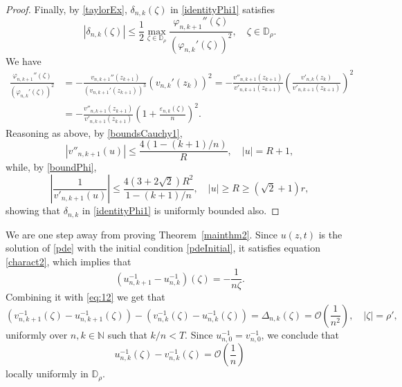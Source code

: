\documentclass[reqno,11pt]{amsart}
\theoremstyle{plain}
\theoremstyle{definition}
\theoremstyle{remark}
\numberwithin{equation}{section}
\numberwithin{equation}{section}
\newcommand{\N}{\mathbb{N}}
\newcommand{\D}{\mathbb{D}}
\begin{document}
\begin{proof}
Finally, by \eqref{taylorEx}, $\delta_{n, k}(\zeta)$ in \eqref{identityPhi1} satisfies   
\begin{equation}
    \label{eq:13}
\left|\delta_{n, k}(\zeta)\right| \leq \frac{1}{2 }   \max _{\zeta \in \D_\rho} \frac{ \varphi_{n, k+1}'' \left(\zeta\right)}{ \left( \varphi_{n, k}' \left(\zeta\right)\right)^2 },\quad \zeta\in \D_\rho.
\end{equation}
We have
\begin{align*}
\frac{ \varphi_{n, k+1}'' \left(\zeta\right)}{ \left( \varphi_{n, k}' \left(\zeta\right)\right)^2 } 
&= - \frac{   \,v_{n, k+1}''  \left(z_{k+1} \right)}{ \left(   v_{n, k+1}' \left(z_{k+1}\right)\right)^3 } \left(  v_{n, k}' \left(z_k\right)\right)^2 
= - \frac{   v''_{n, k+1} \left(z_{k+1} \right)}{    v'_{n, k+1} \left(z_{k+1}\right)  } \left( \frac{  v'_{n, k} \left(z_k\right)}{  v'_{n, k+1} \left(z_{k+1} \right)}\right)^2 
\\
& = - \frac{   v''_{n, k+1} \left(z_{k+1} \right)}{   v'_{n, k+1} \left(z_{k+1}\right)  } \left(  1+ \frac{\varepsilon_{n,k}(\zeta)}{n}\right)^2.
\end{align*}
Reasoning as above, by \eqref{boundsCauchy1},
$$
\left|   v''_{n, k+1} \left(u \right)\right| \le   \frac{4\left( 1-(k+1)/n\right)}{R}, \quad |u|=R+1,
$$
while, by \eqref{boundPhi},
$$
\left| \frac{1}{  v'_{n, k+1}(u) } \right| \le   \frac{4(3+2 \sqrt{2}) R^2}{1-(k+1)/n}, \quad |u|\ge R\ge (\sqrt{2}+1)r,
$$
showing that $\delta_{n,k}$ in \eqref{identityPhi1} is uniformly bounded also.
\end{proof}

We are one step away from proving Theorem~\ref{mainthm2}. Since $u(z,t)$ is the solution of \eqref{pde} with the initial condition \eqref{pdeInitial}, it satisfies equation \eqref{charact2}, which implies that 
$$
\left(u_{n, k+1}^{-1}-u_{n, k}^{-1}\right)(\zeta)=-\frac{1}{n \zeta}.
$$
Combining it with \eqref{eq:12} we get that
$$
\left(v_{n,k+1}^{-1}\left(\zeta\right) - u_{n,k+1}^{-1}\left(\zeta\right) \right) - \left(v_{n, k}^{-1}(\zeta) - u_{n,k}^{-1}\left(\zeta\right)\right) = \Delta_{n, k}(\zeta)=\mathcal O \left(\frac{1}{n^2} \right), \quad |\zeta|=\rho',
$$
uniformly over $n, k \in \N$ such that $k / n<T$. Since $u_{n, 0}^{-1}=v_{n, 0}^{-1}$, we conclude that 
\begin{equation}
    \label{proximityInverses}
u_{n, k}^{-1}(\zeta)-v_{n, k}^{-1}(\zeta)=\mathcal O\left(\frac{1}{n}\right)
\end{equation}
locally uniformly in $\mathbb D_\rho$.
\end{document}

